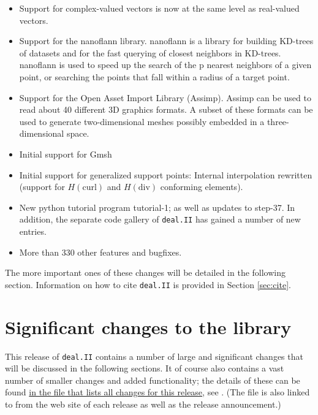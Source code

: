 \documentclass{ansarticle-preprint}
\newcommand{\specialword}[1]{\texttt{#1}}
\newcommand{\dealii}{{\specialword{deal.II}}}
\begin{document}
\begin{itemize}
\item
  Support for complex-valued vectors is now at the same level as real-valued
  vectors.

\item
  Support for the nanoflann library. nanoflann is a library for building
  KD-trees of datasets and for the fast querying of closest neighbors in
  KD-trees. nanoflann is used to speed up the search of the p nearest neighbors
  of a given point, or searching the points that fall within a radius of a
  target point.

\item
  Support for the Open Asset Import Library (Assimp). Assimp can be used to read
  about 40 different 3D graphics formats. A subset of these formats can be used
  to generate two-dimensional meshes possibly embedded in a three-dimensional
  space.

\item
  Initial support for Gmsh

\item
  Initial support for generalized support points: Internal interpolation
  rewritten (support for $H(\text{curl})$ and $H(\text{div})$ conforming
  elements).

\item New python tutorial program tutorial-1; as well as
  updates to step-37. In addition, the separate code
  gallery of \dealii{} has gained a number of new entries.

  \item More than 330 other features and bugfixes.
\end{itemize}
The more important ones of these changes will be detailed in the
following section.  Information on how to cite \dealii{} is provided
in Section \ref{sec:cite}.



\section{Significant changes to the library}

This release of \dealii{} contains a number of large and significant changes
that will be discussed in the following sections. It of course also contains a
vast number of smaller changes and added functionality; the details of these
can be found
\href{https://www.dealii.org/developer/doxygen/deal.II/changes_between_8_5_and_9_0.html}{
in the file that lists all changes for this release}, see \cite{changes90}.
(The file is also linked to from the web site of each release as well as
the release announcement.)
\end{document}
